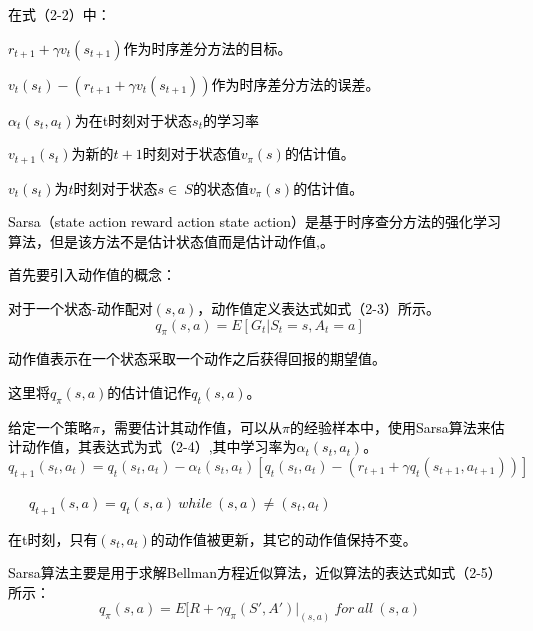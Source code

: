\textcolor{black}{在式（2-2）中：}

\textcolor{black}{$r_{t+1}+\gamma v_{t}(s_{t+1})$作为时序差分方法的目标。}

\textcolor{black}{$v_{t}(s_{t})-(r_{t+1}+\gamma v_{t}(s_{t+1}))$作为时序差分方法的误差。}

\textcolor{black}{$\alpha_{t}(s_{t},a_{t})$为在{t}时刻对于状态$s_{t}$的学习率}

\textcolor{black}{$v_{t+1}(s_{t})$为新的$t+1$时刻对于状态值$v_{\pi}(s)$的估计值。}

\textcolor{black}{$v_{t}(s_{t})$为$t$时刻对于状态$s\in\ S$的状态值$v_{\pi}(s)$的估计值。}

\textcolor{black}{Sarsa（state action reward action state action）是基于时序查分方法的强化学习算法，但是该方法不是估计状态值而是估计动作值\parencite{ref29},\parencite{ref30}。}

\textcolor{black}{首先要引入动作值的概念：}

\textcolor{black}{对于一个状态-动作配对${(s,a)}$，动作值定义表达式如式（2-3）所示。}
\begin{equation}
q_{\pi}\left({s,a}\right)={E}\left[\left.{G}_{t}\right|{S}_{t}{=s,} {A}_{t}{=a} \right] 
\end{equation}

\textcolor{black}{动作值表示在一个状态采取一个动作之后获得回报的期望值。}

\textcolor{black}{这里将${q}_{\pi}\left({s,a}\right)$的估计值记作${q}_{t}\left({s,a}\right)$。}

\textcolor{black}{给定一个策略$\pi$，需要估计其动作值，可以从$\pi$的经验样本中，使用Sarsa算法来估计动作值，其表达式为式（2-4）,其中学习率为$\alpha _{t}(s_{t},a_{t})$。}
\begin{equation}
q_{t+1}(s_{t},a_{t})=q_{t}(s_{t},a_{t})-\alpha _{t}(s_{t},a_{t})[q_{t}(s_{t},a_{t})-(r_{t+1}+\gamma q_{t}(s_{t+1},a_{t+1}))]    
\end{equation}

\textcolor{black}{\ \ \ $q_{t+1}(s,a)=q_{t}(s,a) \ while \ (s,a) \neq (s_{t},a_{t})$}

\textcolor{black}{在t时刻，只有$\left({s}_{t}{,} {a}_{t}\right)$的动作值被更新，其它的动作值保持不变。}

\textcolor{black}{Sarsa算法主要是用于求解Bellman方程近似算法，近似算法的表达式如式（2-5）所示：}
\begin{equation}
{q}_{\pi}({s,a}){=E}[R+\gamma q_{\pi}(S',A')|_{(s,a)} \ for \ all \ (s,a) 
\end{equation}

